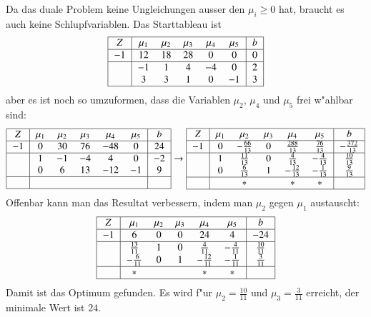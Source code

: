 \begin{beispiel}
Da das duale Problem keine 
Ungleichungen ausser den $\mu_i\ge 0$ hat, braucht es auch keine Schlupfvariablen.
Das Starttableau ist 
\[
\begin{tabular}{|>{$}c<{$}|>{$}c<{$}>{$}c<{$}>{$}c<{$}>{$}c<{$}>{$}c<{$}|>{$}c<{$}|}
\hline
 Z&\mu_1&\mu_2&\mu_3&\mu_4&\mu_5&b\\
\hline
-1&   12&   18&   28&    0&    0&0\\
\hline
  &   -1&    1&    4&   -4&    0&2\\
  &    3&    3&    1&    0&   -1&3\\
\hline
\end{tabular}
\]
aber es ist noch so umzuformen, dass die Variablen $\mu_2$, $\mu_4$ und $\mu_5$ frei
w"ahlbar sind:
\[
\begin{tabular}{|>{$}c<{$}|>{$}c<{$}>{$}c<{$}>{$}c<{$}>{$}c<{$}>{$}c<{$}|>{$}c<{$}|}
\hline
 Z&\mu_1&\mu_2&\mu_3&\mu_4&\mu_5& b\\
\hline
-1&    0&   30&   76&  -48&    0&24\\
\hline
  &    1&   -1&   -4&    4&    0&-2\\
  &    0&    6&   13&  -12&   -1& 9\\
\hline
  &     &     &     &     &     &  \\
\hline
\end{tabular}
\rightarrow
\begin{tabular}{|>{$}c<{$}|>{$}c<{$}>{$}c<{$}>{$}c<{$}>{$}c<{$}>{$}c<{$}|>{$}c<{$}|}
\hline
 Z&\mu_1&         \mu_2&\mu_3&          \mu_4&        \mu_5&           b\\
\hline
-1&    0&-\frac{66}{13}&    0&\frac{288}{13}&\frac{76}{13}&-\frac{372}{13}\\
\hline
  &    1& \frac{11}{13}&    0&  \frac{4}{13}&-\frac{4}{13}&  \frac{10}{13}\\
  &    0&  \frac{6}{13}&    1&-\frac{12}{13}&-\frac{1}{13}&   \frac{9}{13}\\
\hline
  &    &              *&     &             *&            *&               \\
\hline
\end{tabular}
\]
Offenbar kann man das Resultat verbessern, indem man $\mu_2$ gegen $\mu_1$ austauscht:
\[
\begin{tabular}{|>{$}c<{$}|>{$}c<{$}>{$}c<{$}>{$}c<{$}>{$}c<{$}>{$}c<{$}|>{$}c<{$}|}
\hline
 Z&        \mu_1&         \mu_2&\mu_3&          \mu_4&       \mu_5&              b\\
\hline
-1&            6&             0&    0&            24&            4&            -24\\
\hline
  &\frac{13}{11}&             1&    0&  \frac{4}{11}&-\frac{4}{11}&  \frac{10}{11}\\
  &-\frac{6}{11}&             0&    1&-\frac{12}{11}&-\frac{1}{11}&   \frac{3}{11}\\
\hline
  &            *&              &     &             *&            *&               \\
\hline
\end{tabular}
\]
Damit ist das Optimum gefunden.
Es wird f"ur $\mu_2=\frac{10}{11}$ und $\mu_3=\frac{3}{11}$ erreicht,
der minimale Wert ist $24$. 
\end{beispiel}

